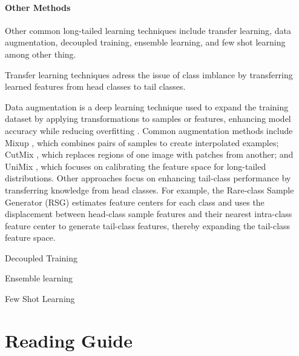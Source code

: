 \paragraph{Other Methods}
Other common long-tailed learning techniques include transfer learning, data augmentation, decoupled training, ensemble learning, and few shot learning among other thing.

Transfer learning techniques adress the issue of class imblance by transferring learned features from head classes to tail classes. 

Data augmentation is a deep learning technique used to expand the training dataset by applying transformations to samples or features, enhancing model accuracy while reducing overfitting \cite{perez2017effectivenessdataaugmentationimage,shorten2019survey}. Common augmentation methods include Mixup \cite{zhang2018mixupempiricalriskminimization}, which combines pairs of samples to create interpolated examples; CutMix \cite{yun2019cutmixregularizationstrategytrain}, which replaces regions of one image with patches from another; and UniMix \cite{xu2021calibratedmodellongtailedvisual}, which focuses on calibrating the feature space for long-tailed distributions. Other approaches focus on enhancing tail-class performance by transferring knowledge from head classes. For example, the Rare-class Sample Generator (RSG) \cite{wang2021rsgsimpleeffectivemodule} estimates feature centers for each class and uses the displacement between head-class sample features and their nearest intra-class feature center to generate tail-class features, thereby expanding the tail-class feature space.

Decoupled Training 

Ensemble learning

Few Shot Learning

\section{Reading Guide}

